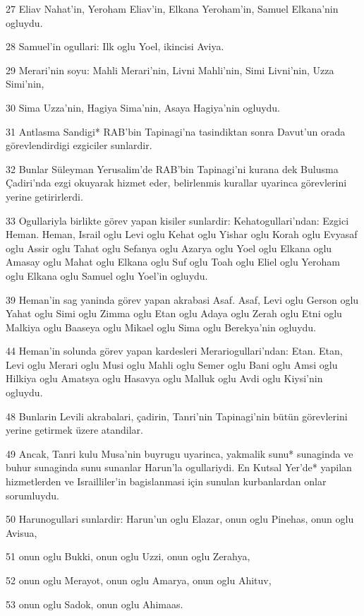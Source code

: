 \par 27 Eliav Nahat'in, Yeroham Eliav'in, Elkana Yeroham'in, Samuel Elkana'nin ogluydu.
\par 28 Samuel'in ogullari: Ilk oglu Yoel, ikincisi Aviya.
\par 29 Merari'nin soyu: Mahli Merari'nin, Livni Mahli'nin, Simi Livni'nin, Uzza Simi'nin,
\par 30 Sima Uzza'nin, Hagiya Sima'nin, Asaya Hagiya'nin ogluydu.
\par 31 Antlasma Sandigi* RAB'bin Tapinagi'na tasindiktan sonra Davut'un orada görevlendirdigi ezgiciler sunlardir.
\par 32 Bunlar Süleyman Yerusalim'de RAB'bin Tapinagi'ni kurana dek Bulusma Çadiri'nda ezgi okuyarak hizmet eder, belirlenmis kurallar uyarinca görevlerini yerine getirirlerdi.
\par 33 Ogullariyla birlikte görev yapan kisiler sunlardir: Kehatogullari'ndan: Ezgici Heman. Heman, Israil oglu Levi oglu Kehat oglu Yishar oglu Korah oglu Evyasaf oglu Assir oglu Tahat oglu Sefanya oglu Azarya oglu Yoel oglu Elkana oglu Amasay oglu Mahat oglu Elkana oglu Suf oglu Toah oglu Eliel oglu Yeroham oglu Elkana oglu Samuel oglu Yoel'in ogluydu.
\par 39 Heman'in sag yaninda görev yapan akrabasi Asaf. Asaf, Levi oglu Gerson oglu Yahat oglu Simi oglu Zimma oglu Etan oglu Adaya oglu Zerah oglu Etni oglu Malkiya oglu Baaseya oglu Mikael oglu Sima oglu Berekya'nin ogluydu.
\par 44 Heman'in solunda görev yapan kardesleri Merariogullari'ndan: Etan. Etan, Levi oglu Merari oglu Musi oglu Mahli oglu Semer oglu Bani oglu Amsi oglu Hilkiya oglu Amatsya oglu Hasavya oglu Malluk oglu Avdi oglu Kiysi'nin ogluydu.
\par 48 Bunlarin Levili akrabalari, çadirin, Tanri'nin Tapinagi'nin bütün görevlerini yerine getirmek üzere atandilar.
\par 49 Ancak, Tanri kulu Musa'nin buyrugu uyarinca, yakmalik sunu* sunaginda ve buhur sunaginda sunu sunanlar Harun'la ogullariydi. En Kutsal Yer'de* yapilan hizmetlerden ve Israilliler'in bagislanmasi için sunulan kurbanlardan onlar sorumluydu.
\par 50 Harunogullari sunlardir: Harun'un oglu Elazar, onun oglu Pinehas, onun oglu Avisua,
\par 51 onun oglu Bukki, onun oglu Uzzi, onun oglu Zerahya,
\par 52 onun oglu Merayot, onun oglu Amarya, onun oglu Ahituv,
\par 53 onun oglu Sadok, onun oglu Ahimaas.
